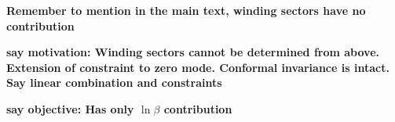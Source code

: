 {\bf\color{red}Remember to mention in the main text, winding sectors have no contribution}

{\bf\color{red} say motivation: Winding sectors cannot be determined from above. Extension of constraint to zero mode. Conformal invariance is intact. Say linear combination and constraints }

{\bf\color{red} say objective: Has only $\ln\beta$ contribution}


